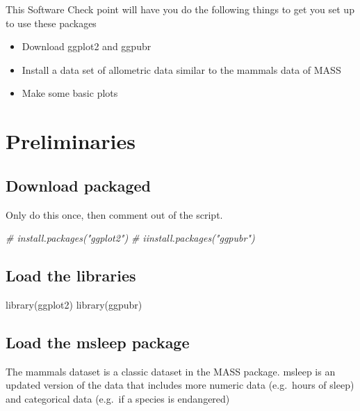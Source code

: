 \documentclass[
]{book}
\newenvironment{Shaded}{\begin{snugshade}}{\end{snugshade}}
\newcommand{\CommentTok}[1]{\textcolor[rgb]{0.56,0.35,0.01}{\textit{#1}}}
\newcommand{\FunctionTok}[1]{\textcolor[rgb]{0.00,0.00,0.00}{#1}}
\newcommand{\NormalTok}[1]{#1}
\providecommand{\tightlist}{%
  \setlength{\itemsep}{0pt}\setlength{\parskip}{0pt}}
\begin{document}
This Software Check point will have you do the following things to get you set up to use these packages

\begin{itemize}
\tightlist
\item
  Download ggplot2 and ggpubr
\item
  Install a data set of allometric data similar to the mammals data of MASS
\item
  Make some basic plots
\end{itemize}

\hypertarget{preliminaries-6}{%
\section{Preliminaries}\label{preliminaries-6}}

\hypertarget{download-packaged-2}{%
\subsection{Download packaged}\label{download-packaged-2}}

Only do this once, then comment out of the script.

\begin{Shaded}
\begin{Highlighting}[]
\CommentTok{\# install.packages("ggplot2")}
\CommentTok{\# iinstall.packages("ggpubr")}
\end{Highlighting}
\end{Shaded}

\hypertarget{load-the-libraries-2}{%
\subsection{Load the libraries}\label{load-the-libraries-2}}

\begin{Shaded}
\begin{Highlighting}[]
\FunctionTok{library}\NormalTok{(ggplot2)}
\FunctionTok{library}\NormalTok{(ggpubr)}
\end{Highlighting}
\end{Shaded}

\hypertarget{load-the-msleep-package-2}{%
\subsection{Load the msleep package}\label{load-the-msleep-package-2}}

The mammals dataset is a classic dataset in the MASS package. msleep is an updated version of the data that includes more numeric data (e.g.~hours of sleep) and categorical data (e.g.~if a species is endangered)
\end{document}
